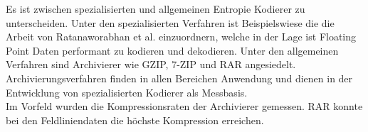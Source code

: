 Es ist zwischen spezialisierten und allgemeinen Entropie Kodierer zu unterscheiden. Unter den spezialisierten Verfahren ist Beispielswiese die die Arbeit von Ratanaworabhan et al.\cite{ratanaworabhan2006fast} einzuordnern, welche in der Lage ist Floating Point Daten performant zu kodieren und dekodieren. Unter den allgemeinen Verfahren sind Archivierer wie GZIP\cite{website:gzip}, 7-ZIP\cite{website:7zip} und RAR\cite{website:rar} angesiedelt. Archivierungsverfahren finden in allen Bereichen Anwendung und dienen in der Entwicklung von spezialisierten Kodierer als Messbasis.\\
Im Vorfeld wurden die Kompressionsraten der Archivierer gemessen. RAR konnte bei den Feldliniendaten die höchste Kompression erreichen.